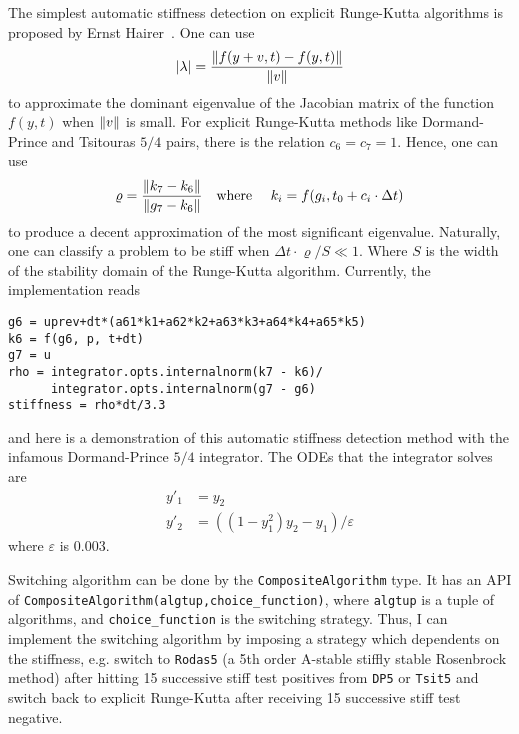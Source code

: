\documentclass[12pt,a4paper]{article}
\begin{document}
The simplest automatic stiffness detection on explicit Runge-Kutta algorithms
is proposed by Ernst Hairer~\cite{hairer2}. One can use
\begin{equation}
  \abs{\lambda} = \frac{\norm{f(y+v, t)-f(y, t)}}{\norm{v}}
\end{equation}
to approximate the dominant eigenvalue of the Jacobian matrix of the function
$f(y, t)$ when $\norm{v}$ is small. For explicit Runge-Kutta methods like
Dormand-Prince and Tsitouras $5/4$ pairs, there is the relation $c_6 = c_7 =
1$. Hence, one can use
\begin{equation}
  \varrho = \frac{\norm{k_7-k_6}}{\norm{g_7-k_6}}\qqtext{where } k_i = f(g_i,
  t_0 + c_i\cdot \Delta t)
\end{equation}
to produce a decent approximation of the most significant eigenvalue.
Naturally, one can classify a problem to be stiff when $\Delta
t\cdot\varrho/S \ll 1$. Where $S$ is the width of the stability domain of the
Runge-Kutta algorithm. Currently, the implementation reads

\begin{lstlisting}
g6 = uprev+dt*(a61*k1+a62*k2+a63*k3+a64*k4+a65*k5)
k6 = f(g6, p, t+dt)
g7 = u
rho = integrator.opts.internalnorm(k7 - k6)/
      integrator.opts.internalnorm(g7 - g6)
stiffness = rho*dt/3.3
\end{lstlisting}

and here is a demonstration of this automatic stiffness detection method with
the infamous Dormand-Prince $5/4$ integrator. The ODEs that the integrator
solves are
\begin{align}
  y'_1 &= y_2\\
  y'_2 &= ((1-y_1^2)y_2-y_1) / \varepsilon
\end{align}
where $\varepsilon$ is $0.003$.



%
%
Switching algorithm can be done by the \texttt{CompositeAlgorithm} type. It has
an API of \texttt{CompositeAlgorithm(algtup,choice\_function)}, where
\texttt{algtup} is a tuple of algorithms, and \texttt{choice\_function} is the
switching strategy. Thus, I can implement the switching algorithm by imposing a
strategy which dependents on the stiffness, e.g. switch to \texttt{Rodas5} (a
5th order A-stable stiffly stable Rosenbrock method) after hitting 15
successive stiff test positives from \texttt{DP5} or \texttt{Tsit5} and switch
back to explicit Runge-Kutta after receiving 15 successive stiff test negative.
\end{document}
